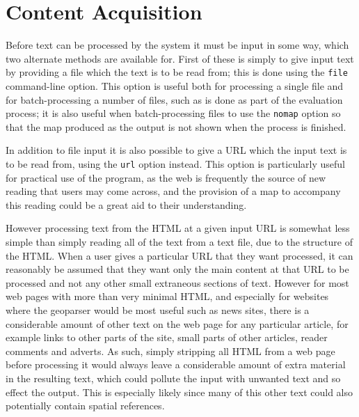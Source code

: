 \documentclass[12pt, a4paper]{report}
\begin{document}
\section{Content Acquisition}

Before text can be processed by the system it must be input in some way, which two alternate methods are available for. First of these is simply to give input text by providing a file which the text is to be read from; this is done using the \verb#file# command-line option. This option is useful both for processing a single file and for batch-processing a number of files, such as is done as part of the evaluation process; it is also useful when batch-processing files to use the \verb#nomap# option so that the map produced as the output is not shown when the process is finished.

In addition to file input it is also possible to give a URL which the input text is to be read from, using the \verb#url# option instead. This option is particularly useful for practical use of the program, as the web is frequently the source of new reading that users may come across, and the provision of a map to accompany this reading could be a great aid to their understanding.

However processing text from the HTML at a given input URL is somewhat less simple than simply reading all of the text from a text file, due to the structure of the HTML. When a user gives a particular URL that they want processed, it can reasonably be assumed that they want only the main content at that URL to be processed and not any other small extraneous sections of text. However for most web pages with more than very minimal HTML, and especially for websites where the geoparser would be most useful such as news sites, there is a considerable amount of other text on the web page for any particular article, for example links to other parts of the site, small parts of other articles, reader comments and adverts. As such, simply stripping all HTML from a web page before processing it would always leave a considerable amount of extra material in the resulting text, which could pollute the input with unwanted text and so effect the output. This is especially likely since many of this other text could also potentially contain spatial references.
\end{document}
